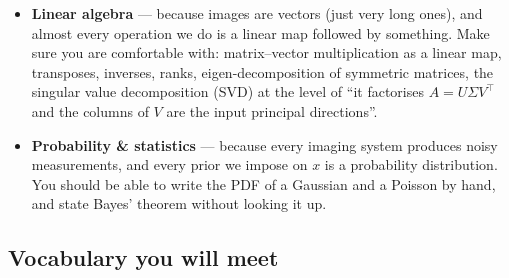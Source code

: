 \documentclass[11pt,a4paper]{article}
\begin{document}
\begin{itemize}[leftmargin=*,nosep]
  \item \textbf{Linear algebra} --- because images are vectors (just
        very long ones), and almost every operation we do is a linear
        map followed by something. Make sure you are comfortable with:
        matrix--vector multiplication as a linear map, transposes,
        inverses, ranks, eigen-decomposition of symmetric matrices,
        the singular value decomposition (SVD) at the level of
        ``it factorises $A = U\Sigma V^\top$ and the columns of $V$
        are the input principal directions''.
  \item \textbf{Probability \& statistics} --- because every imaging
        system produces noisy measurements, and every prior we
        impose on $x$ is a probability distribution. You should be
        able to write the PDF of a Gaussian and a Poisson by hand,
        and state Bayes' theorem without looking it up.
\end{itemize}

\subsection{Vocabulary you will meet}
\end{document}

